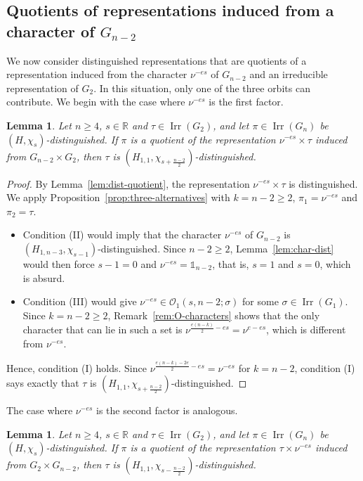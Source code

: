 \documentclass[11pt]{amsart}
\numberwithin{equation}{section}
\theoremstyle{plain}
\newtheorem{lemma}[theorem]{Lemma}
\theoremstyle{definition}
\theoremstyle{remark}
\newcommand{\R}{\mathbb{R}}
\newcommand{\one}{\mathds{1}}
\DeclareMathOperator{\Irr}{Irr}
\begin{document}
\subsection{Quotients of representations induced from a character of \texorpdfstring{$G_{n-2}$}{Gn-2}}\label{ss:quotient-char-Gn2}

We now consider distinguished representations that are quotients of a representation induced from the character $\nu^{-es}$ of $G_{n-2}$ and an irreducible representation of $G_2$. In this situation, only one of the three orbits can contribute. We begin with the case where $\nu^{-es}$ is the first factor.

\begin{lemma}\label{lem:quot-nu-tau}
	Let $n\ge4$, $s\in\R$ and $\tau\in\Irr(G_2)$, and let $\pi\in\Irr(G_n)$ be $(H,\chi_s)$-distinguished. If $\pi$ is a quotient of the representation $\nu^{-es}\times\tau$ induced from $G_{n-2}\times G_2$, then $\tau$ is $(H_{1,1},\chi_{s+\frac{n-2}2})$-distinguished.
\end{lemma}

\begin{proof}
	By Lemma~\ref{lem:dist-quotient}, the representation $\nu^{-es}\times\tau$ is distinguished. We apply Proposition~\ref{prop:three-alternatives} with $k=n-2\ge2$, $\pi_1=\nu^{-es}$ and $\pi_2=\tau$.
	\begin{itemize}
		\item Condition (II) would imply that the character $\nu^{-es}$ of $G_{n-2}$ is $(H_{1,n-3},\chi_{s-1})$-distinguished. Since $n-2\ge2$, Lemma~\ref{lem:char-dist} would then force $s-1=0$ and $\nu^{-es}=\one_{n-2}$, that is, $s=1$ and $s=0$, which is absurd.
		\item Condition (III) would give $\nu^{-es}\in\mathcal O_1(s,n-2;\sigma)$ for some $\sigma\in\Irr(G_1)$. Since $k=n-2\ge2$, Remark~\ref{rem:O-characters} shows that the only character that can lie in such a set is $\nu^{\frac{e(n-k)}2-es}=\nu^{e-es}$, which is different from $\nu^{-es}$.
	\end{itemize}
	Hence, condition (I) holds. Since $\nu^{\frac{e(n-k)-2e}2-es}=\nu^{-es}$ for $k=n-2$, condition (I) says exactly that $\tau$ is $(H_{1,1},\chi_{s+\frac{n-2}2})$-distinguished.
\end{proof}

The case where $\nu^{-es}$ is the second factor is analogous.

\begin{lemma}\label{lem:quot-tau-nu}
	Let $n\ge4$, $s\in\R$ and $\tau\in\Irr(G_2)$, and let $\pi\in\Irr(G_n)$ be $(H,\chi_s)$-distinguished. If $\pi$ is a quotient of the representation $\tau\times\nu^{-es}$ induced from $G_2\times G_{n-2}$, then $\tau$ is $(H_{1,1},\chi_{s-\frac{n-2}2})$-distinguished.
\end{lemma}
\end{document}
